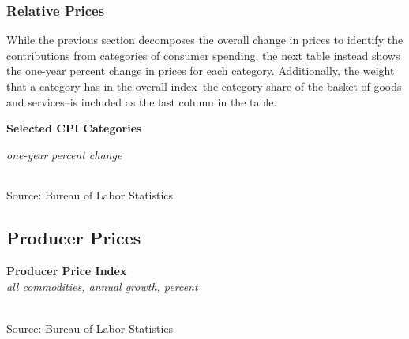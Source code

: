 \documentclass{report}
\makeatletter
\newcommand{\tbllink}[1]{\href{https://raw.githubusercontent.com/bdecon/US-chartbook/master/chartbook/data/#1}{\faTable}}
\newcommand*\short[1]{\expandafter\@gobbletwo\number\numexpr#1\relax}
\newcommand{\dateaxisticks}{
		date coordinates in=x, axis line style={draw=none},
		xmax={2022-01-30},
		max space between ticks=40,	    
		xtick={{1990-01-01}, {1992-01-01}, {1994-01-01}, 
			{1996-01-01}, {1998-01-01}, {2000-01-01}, 
			{2002-01-01}, {2004-01-01}, {2006-01-01},
			{2008-01-01}, {2010-01-01}, {2012-01-01}, {2014-01-01},
		    {2016-01-01}, {2018-01-01}, {2020-01-01}, {2022-01-01}},
		minor xtick={{1989-01-01}, {1991-01-01}, {1993-01-01},
			{1995-01-01}, {1997-01-01}, {1999-01-01}, 
			{2001-01-01}, {2003-01-01}, {2005-01-01}, {2007-01-01},
		    {2009-01-01}, {2011-01-01}, {2013-01-01}, {2015-01-01},
		    {2017-01-01}, {2019-01-01}, {2021-01-01}},
		enlarge y limits={0.06}, enlarge x limits={0.01},
		}
\newcommand{\bbar}[2]{extra #1 ticks = {{#2}}, extra #1 tick labels = ,
		extra #1 tick style = {grid=major, grid style={thick, black!25}},}
\newcommand{\stdline}[4]{\addplot[very thick, no markers, color=#1] 
		table [x=#2, y=#3, col sep=comma] {#4};	}
\newcommand{\rbars}{
		\fill[color=black!10] (axis cs:{1990-07-01},\pgfkeysvalueof{/pgfplots/ymin}) rectangle 
			(axis cs:{1991-03-01}, \pgfkeysvalueof{/pgfplots/ymax});
		\fill[color=black!10] (axis cs:{2007-12-01},\pgfkeysvalueof{/pgfplots/ymin}) rectangle 
			(axis cs:{2009-07-01}, \pgfkeysvalueof{/pgfplots/ymax});
		\fill[color=black!10] (axis cs:{2001-03-01},\pgfkeysvalueof{/pgfplots/ymin}) rectangle 
			(axis cs:{2001-11-01}, \pgfkeysvalueof{/pgfplots/ymax});
		\fill[color=black!10] (axis cs:{2020-02-01},\pgfkeysvalueof{/pgfplots/ymin}) rectangle 
			(axis cs:{2020-05-01}, \pgfkeysvalueof{/pgfplots/ymax});}
\makeatother
\begin{document}
{{\begin{minipage}{0.76\textwidth}
\subsubsection*{\color{black!70} \seriffont Relative Prices}
\small While the previous section decomposes the overall change in prices to identify the contributions from categories of consumer spending, the next table instead shows the one-year percent change in prices for each category. Additionally, the weight that a category has in the overall index--the category share of the basket of goods and services--is included as the last column in the table.
\vspace{1.5mm}

\normalsize \textbf{Selected CPI Categories}\\
\footnotesize{\textit{one-year percent change}\\
\hspace*{-3mm}  \setlength{\tabcolsep}{3.1pt} \color{black!90}
		{\renewcommand{\arraystretch}{1.54}
\begin{tabular}{p{41mm} R{7.0mm} R{7.0mm} R{7.0mm} R{7.0mm}
		 		 R{7.0mm} R{7.0mm} R{7.0mm} R{10mm}} %
			  \hline
		\end{tabular}}}
\vspace{-2mm}		
		
\footnotesize{Source: Bureau of Labor Statistics}
\vspace{3.5mm}

\small 
\end{minipage}
\newpage
\subsection*{\color{black!70} \seriffont Producer Prices}
\vspace{1mm}

\begin{minipage}{0.47\textwidth}
\normalsize \textbf{Producer Price Index}\\
\footnotesize{\textit{all commodities, annual growth, percent}}\\
\hspace*{-2mm} \\
\footnotesize{Source: Bureau of Labor Statistics} \hfill \tbllink{ppi.csv}
\end{minipage} \hspace{6mm} 
\begin{minipage}{0.24\textwidth}
\small 
\end{minipage}
\newpage
}}
\end{document}
